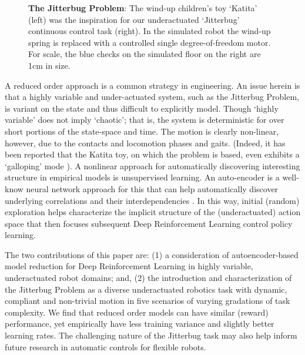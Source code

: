 \documentclass[letterpaper, 10 pt, conference]{ieeeconf}
\begin{document}
\begin{figure}[ht]
    \caption{
        \textbf{The Jitterbug Problem}: The wind-up children's toy `Katita' (left) was the inspiration for our underactuated `Jitterbug' continuous control task (right).
        In the simulated robot the wind-up spring is replaced with a controlled single degree-of-freedom motor.
        For scale, the blue checks on the simulated floor on the right are 1cm in size.
    }
    \label{fig:leader}
    
\end{figure}

A reduced order approach is a common strategy in engineering.   An issue herein is that a highly variable and under-actuated system, such as the Jitterbug Problem, is variant on the state and thus difficult to explicitly model. 
Though `highly variable' does not imply `chaotic'; that is, the system is deterministic for over short portions of the state-space and time.  The motion is clearly non-linear, however, due to the contacts and locomotion phases and gaits.  (Indeed, it has been reported that the Katita toy, on which the problem is based, even exhibits a `galloping' mode \cite{jgn.thesis}).  A nonlinear approach for automatically discovering interesting structure in empirical models is unsupervised learning.  An auto-encoder is a well-know neural network approach for this that can help automatically discover underlying correlations and their interdependencies \cite{AE_hinton2006reducing}.   %
In this way, initial (random) exploration helps characterize the implicit structure of the (underactuated) action space that then focuses subsequent Deep Reinforcement Learning control policy learning.

The two contributions of this paper are: (1) a consideration of autoencoder-based model reduction for Deep Reinforcement Learning in highly variable, underactuated robot domains; and, (2) the introduction and characterization of the Jitterbug Problem as a diverse underactuated robotics task with dynamic, compliant and non-trivial motion in five scenarios of varying gradations of task complexity.  We find that reduced order models can have similar (reward) performance, yet empirically have less training variance and slightly better learning rates.  The challenging nature of the Jitterbug task may also help inform future research in automatic controls for flexible robots. %
\end{document}
